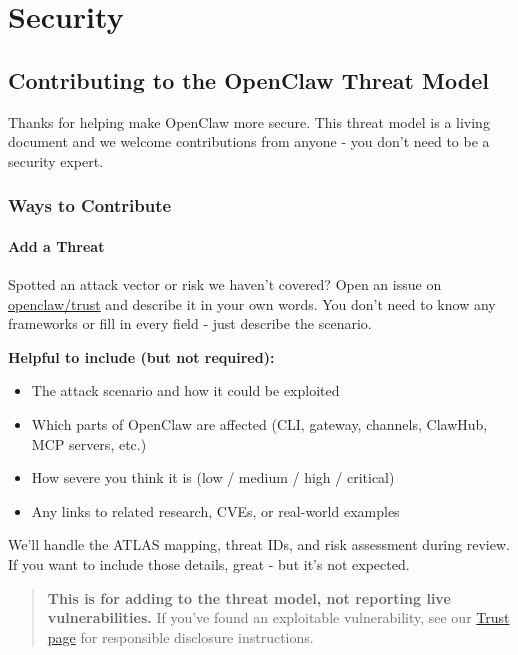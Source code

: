 \chapter{Security}

\section{Contributing to the OpenClaw Threat Model}


Thanks for helping make OpenClaw more secure. This threat model is a living document and we welcome contributions from anyone - you don't need to be a security expert.

\subsection{Ways to Contribute}


\subsubsection{Add a Threat}


Spotted an attack vector or risk we haven't covered? Open an issue on \href{https://github.com/openclaw/trust/issues}{openclaw/trust} and describe it in your own words. You don't need to know any frameworks or fill in every field - just describe the scenario.

\textbf{Helpful to include (but not required):}

\begin{itemize}
  \item The attack scenario and how it could be exploited
  \item Which parts of OpenClaw are affected (CLI, gateway, channels, ClawHub, MCP servers, etc.)
  \item How severe you think it is (low / medium / high / critical)
  \item Any links to related research, CVEs, or real-world examples
\end{itemize}


We'll handle the ATLAS mapping, threat IDs, and risk assessment during review. If you want to include those details, great - but it's not expected.

\begin{quote}
\textbf{This is for adding to the threat model, not reporting live vulnerabilities.} If you've found an exploitable vulnerability, see our \href{https://trust.openclaw.ai}{Trust page} for responsible disclosure instructions.
\end{quote}


